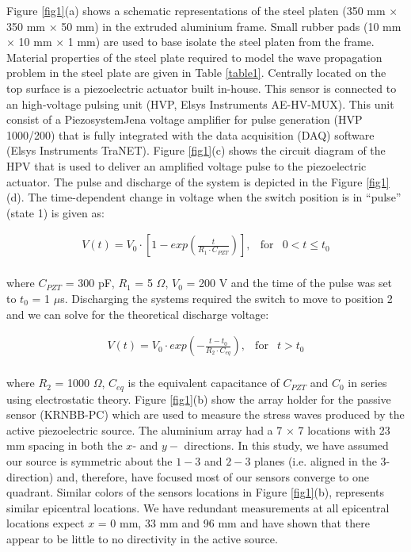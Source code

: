 \documentclass[preprint,3p, 11pt,authoryear]{elsarticle}
\begin{document}
Figure \ref{fig1}(a) shows a schematic representations of the steel platen (350 mm $\times$ 350 mm $\times$ 50 mm) in the extruded aluminium frame. Small rubber pads (10 mm $\times$ 10 mm $\times$ 1 mm) are used to base isolate the steel platen from the frame. Material properties of the steel plate required to model the wave propagation problem in the steel plate are given in Table \ref{table1}. Centrally located on the top surface is a piezoelectric actuator built in-house.  This sensor is connected to an high-voltage pulsing unit (HVP, Elsys Instruments AE-HV-MUX). This unit consist of a PiezosystemJena voltage amplifier for pulse generation (HVP 1000/200) that is fully integrated with the data acquisition (DAQ) software (Elsys Instruments TraNET). Figure \ref{fig1}(c) shows the circuit diagram of the HPV that is used to deliver an amplified voltage pulse to the piezoelectric actuator. The pulse and discharge of the system is depicted in the Figure \ref{fig1}(d). The time-dependent change in voltage when the switch position is in ``pulse'' (state 1) is given as:

\begin{equation}
\begin{array}{lcc}
  V(t) =  V_{0} \cdot \left[ 1 - exp\left(\frac{t}{R_{1}\cdot C_{PZT}} \right) \right], & \text{for} & 0 < t \leq t_{0}\\
\end{array}
\label{eq1}
\end{equation}

\noindent where $C_{PZT}$ = 300 pF, $R_{1}$ = 5 $\Omega$, $V_{0}$ = 200 V and the time of the pulse was set to $t_{0}$ = 1 $\mu$s. Discharging the systems required the switch to move to position 2 and we can solve for the theoretical discharge voltage:

\begin{equation}
\begin{array}{lclcc}
  V(t) =  V_{0} \cdot exp\left(-\frac{t - t_{0}}{R_{2}\cdot C_{eq}}\right), & \text{for} & t > t_{0}\\
\end{array}
\label{eq2}
\end{equation}

\noindent where $R_{2}$ = 1000 $\Omega$, $C_{eq}$ is the equivalent capacitance of $C_{PZT}$ and $C_{0}$ in series using electrostatic theory.  Figure \ref{fig1}(b) show the array holder for the passive sensor (KRNBB-PC) which are used to measure the stress waves produced by the active piezoelectric source. The aluminium array had a 7 $\times$ 7 locations with 23 mm spacing in both the $x$- and $y-$ directions.  In this study, we have assumed our source is symmetric about the $1-3$ and $2-3$ planes (i.e. aligned in the $3$-direction) and, therefore, have focused most of our sensors converge to one quadrant.  Similar colors of the sensors locations in Figure \ref{fig1}(b), represents similar epicentral locations.  We have redundant measurements at all epicentral locations expect $x$ = 0 mm, 33 mm and 96 mm and have shown that there appear to be little to no directivity in the active source.  
\end{document}
